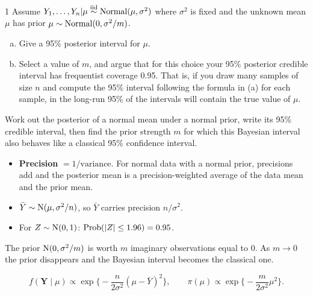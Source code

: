 \documentclass[11pt]{article}
\begin{document}
\clearpage


\begin{problem}{1}
Assume $Y_1,\dots,Y_n|\mu\stackrel{\text{iid}}{\sim}\mathrm{Normal}(\mu,\sigma^2)$ where $\sigma^2$ is fixed and the unknown mean $\mu$ has prior $\mu\sim\mathrm{Normal}(0,\sigma^2/m)$.
\begin{enumerate}[(a)]
\item Give a 95\% posterior interval for $\mu$.
\item Select a value of $m$, and argue that for this choice your 95\% posterior credible interval has frequentist coverage 0.95. That is, if you draw many samples of size $n$ and compute the 95\% interval following the formula in (a) for each sample, in the long-run 95\% of the intervals will contain the true value of $\mu$.
\end{enumerate}
\end{problem}

\begin{restate}
Work out the posterior of a normal mean under a normal prior, write its 95\% credible interval, then find the prior strength $m$ for which this Bayesian interval also behaves like a classical 95\% confidence interval.
\end{restate}

\begin{recall}
\begin{itemize}
\item \textbf{Precision} $=1/\text{variance}$. For normal data with a normal prior, precisions add and the posterior mean is a precision-weighted average of the data mean and the prior mean.
\item $\bar Y\sim\mathrm{N}(\mu,\sigma^2/n)$, so $\bar Y$ carries precision $n/\sigma^2$.
\item For $Z\sim\mathrm{N}(0,1)$: $\mathrm{Prob}(|Z|\le1.96)=0.95$.
\end{itemize}
\end{recall}

\begin{keyidea}
The prior $\mathrm{N}(0,\sigma^2/m)$ is worth $m$ imaginary observations equal to 0. As $m\to0$ the prior disappears and the Bayesian interval becomes the classical one.
\end{keyidea}

\solution
{}
\[
f(\mathbf Y\mid\mu)\propto\exp\Big\{-\frac{n}{2\sigma^2}(\mu-\bar Y)^2\Big\},\qquad\pi(\mu)\propto\exp\Big\{-\frac{m}{2\sigma^2}\mu^2\Big\}.
\]
\end{document}

